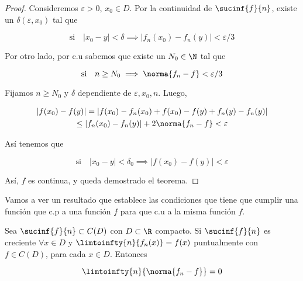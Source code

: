 \begin{proof}
    Consideremos $\varepsilon > 0$, $x_0 \in D$. Por la continuidad de $\sucinf{f}{n}$, existe un $\delta(\varepsilon, x_0)$ tal que
    
    \[
    \text{si} \quad |x_0 - y| < \delta \implies \left|f_n(x_0) - f_n(y) \right| < \varepsilon/3
    \]
    
    Por otro lado, por c.u sabemos que existe un $N_0 \in \N$ tal que
    
    \[
    \text{si} \quad n \geq N_0 \implies \norma{f_n - f} < \varepsilon/3
    \]
    
    Fijamos $n \geq N_0$ y $\delta$ dependiente de $\varepsilon, x_0, n$. Luego,
    
    \begin{gather}
        \left|f(x_0) - f(y)\right| = \left|f(x_0) - f_n(x_0) + f(x_0) - f(y) + f_n(y) - f_n(y) \right| \\
        \leq \left|f_n(x_0) - f_n(y) \right| + 2 \norma{f_n - f} < \varepsilon
    \end{gather}
    
    Así tenemos que
    
    \[
    \text{si} \quad |x_0 - y| < \delta_0 \implies |f(x_0) - f(y)| < \varepsilon
    \]
    
    Así, $f$ es continua, y queda demostrado el teorema.
\end{proof}

Vamos a ver un resultado que establece las condiciones que tiene que cumplir una función que c.p a una función $f$ para que c.u a la misma función $f$.

\begin{teo}\label{teo:diny}
    Sea $\sucinf{f}{n} \subset C(D)$ con $D \subset \R$ compacto. Si $\sucinf{f}{n}$ es creciente $\forall x \in D$ y $\limtoinfty{n}{f_n(x)} = f(x)$ puntualmente con $f \in C(D)$, para cada $x \in D$. Entonces
    
    \[
    \limtoinfty{n}{\norma{f_n - f}} = 0
    \]
\end{teo}

